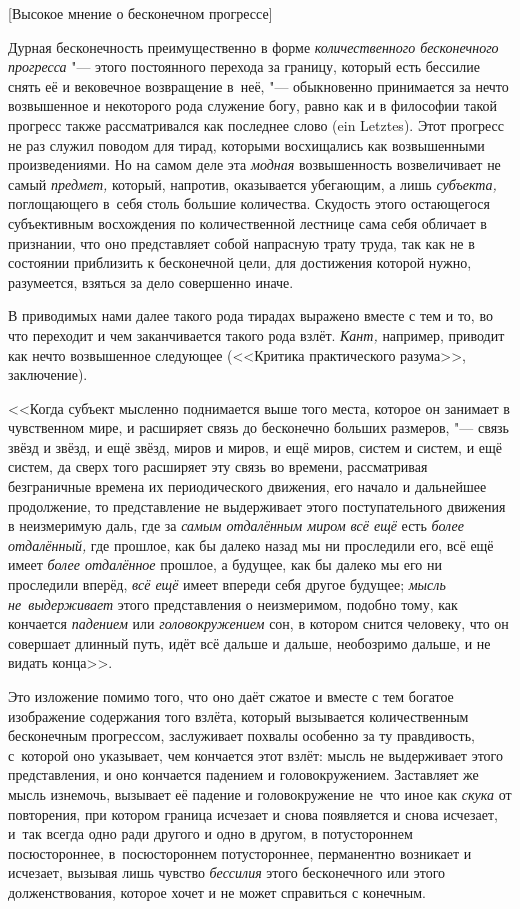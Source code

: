 %
{[Высокое мнение о бесконечном прогрессе]}

Дурная бесконечность преимущественно в форме
{\em количественного бесконечного прогресса} "--- этого постоянного перехода за
границу, который есть бессилие снять её и вековечное возвращение в~неё,
"--- обыкновенно принимается за нечто возвышенное и некоторого рода служение
богу, равно как и в философии такой прогресс также рассматривался как последнее
слово (ein Letz\-tes). Этот прогресс не раз служил поводом для тирад, которыми
восхищались как возвышенными произведениями. Но на самом деле эта {\em модная}
возвышенность возвеличивает не самый {\em предмет,} который, напротив,
оказывается убегающим, а лишь {\em субъекта,} поглощающего в~себя столь большие
количества. Скудость этого остающегося субъективным восхождения по
количественной лестнице сама себя обличает в признании, что оно представляет
собой напрасную трату труда, так как не в состоянии приблизить к бесконечной
цели, для достижения которой нужно, разумеется, взяться за дело совершенно
иначе.

В приводимых нами далее такого рода тирадах выражено вместе с тем и то, во что
переходит и чем заканчивается такого рода взлёт. {\em Кант,} например, приводит
как нечто возвышенное следующее (<<Критика практического разума>>, заключение).

<<Когда субъект мысленно поднимается выше того места, которое он занимает в
чувственном мире, и расширяет связь до бесконечно больших размеров, "--- связь
звёзд и звёзд, и ещё звёзд, миров и миров, и ещё миров, систем и систем, и ещё
систем, да сверх того расширяет эту связь во времени, рассматривая безграничные
времена их периодического движения, его начало и дальнейшее продолжение, то
представление не выдерживает этого поступательного движения в неизмеримую даль,
где за {\em самым отдалённым миром всё ещё} есть {\em более отдалённый,} где
прошлое, как бы далеко назад мы ни проследили его, всё ещё имеет
{\em более отдалённое} прошлое, а будущее, как бы далеко мы его ни проследили
вперёд, {\em всё ещё} имеет впереди себя другое будущее;
{\em мысль не~выдерживает} этого представления о неизмеримом, подобно тому, как
кончается {\em падением} или {\em головокружением} сон, в котором снится
человеку, что он совершает длинный путь, идёт всё дальше и дальше, необозримо
дальше, и не видать конца>>.

Это изложение помимо того, что оно даёт сжатое и вместе с тем богатое
изображение содержания того взлёта, который вызывается количественным
бесконечным прогрессом, заслуживает похвалы особенно за ту правдивость,
с~которой оно указывает, чем кончается этот взлёт: мысль не выдерживает этого
представления, и оно кончается падением и головокружением. Заставляет же мысль
изнемочь, вызывает её падение и головокружение не~что иное как {\em скука} от
повторения, при котором граница исчезает и снова появляется и снова исчезает,
и~так всегда одно ради другого и одно в другом, в потустороннем посюстороннее,
в~посюстороннем потустороннее, перманентно возникает и исчезает, вызывая лишь
чувство {\em бессилия} этого бесконечного или этого долженствования, которое
хочет и не может справиться с конечным.

